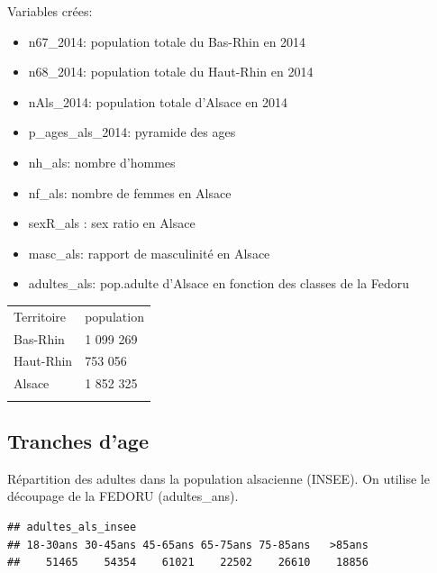 \documentclass[]{article}
\newenvironment{Shaded}{\begin{snugshade}}{\end{snugshade}}
\newcommand{\KeywordTok}[1]{\textcolor[rgb]{0.13,0.29,0.53}{\textbf{{#1}}}}
\newcommand{\DataTypeTok}[1]{\textcolor[rgb]{0.13,0.29,0.53}{{#1}}}
\newcommand{\StringTok}[1]{\textcolor[rgb]{0.31,0.60,0.02}{{#1}}}
\newcommand{\OtherTok}[1]{\textcolor[rgb]{0.56,0.35,0.01}{{#1}}}
\newcommand{\NormalTok}[1]{{#1}}
\begin{document}
Variables crées:

\begin{itemize}
\itemsep1pt\parskip0pt
\item
  n67\_2014: population totale du Bas-Rhin en 2014
\item
  n68\_2014: population totale du Haut-Rhin en 2014
\item
  nAls\_2014: population totale d'Alsace en 2014
\item
  p\_ages\_als\_2014: pyramide des ages
\item
  nh\_als: nombre d'hommes
\item
  nf\_als: nombre de femmes en Alsace
\item
  sexR\_als : sex ratio en Alsace
\item
  masc\_als: rapport de masculinité en Alsace
\item
  adultes\_als: pop.adulte d'Alsace en fonction des classes de la Fedoru
\end{itemize}

\begin{longtable}[c]{@{}ll@{}}
\toprule\addlinespace
Territoire & population
\\\addlinespace
\midrule\endhead
Bas-Rhin & 1 099 269
\\\addlinespace
Haut-Rhin & 753 056
\\\addlinespace
Alsace & 1 852 325
\\\addlinespace
\bottomrule
\end{longtable}

\subsection{Tranches d'age}\label{tranches-dage}

Répartition des adultes dans la population alsacienne (INSEE). On
utilise le découpage de la FEDORU (adultes\_ans).

\begin{Shaded}
\end{Shaded}

\begin{verbatim}
## adultes_als_insee
## 18-30ans 30-45ans 45-65ans 65-75ans 75-85ans   >85ans 
##    51465    54354    61021    22502    26610    18856
\end{verbatim}
\end{document}
